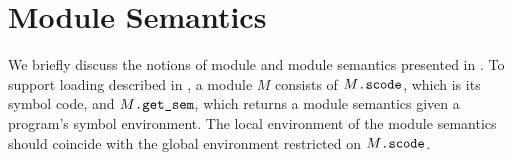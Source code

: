 










\section{Module Semantics}
\label{sec:main-semantics:module}


We briefly discuss the notions of module and module semantics presented in .
%
To support loading described in ,
a module $M$ consists of $M\texttt{.scode}$, which is its symbol
code, and $M\texttt{.get\_sem}$, which returns a module semantics given a program's symbol environment.
The local environment  of the module semantics should coincide with the
global environment restricted on $M\texttt{.scode}$.

